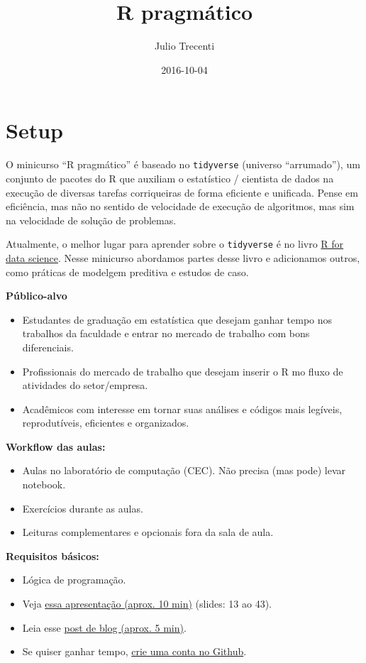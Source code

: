 \documentclass[]{book}
\title{R pragmático}
\author{Julio Trecenti}
\date{2016-10-04}
\providecommand{\tightlist}{%
  \setlength{\itemsep}{0pt}\setlength{\parskip}{0pt}}
\begin{document}
\maketitle

{
\setcounter{tocdepth}{1}
\tableofcontents
}
\chapter{Setup}\label{setup}

O minicurso ``R pragmático'' é baseado no \texttt{tidyverse} (universo
``arrumado''), um conjunto de pacotes do R que auxiliam o estatístico /
cientista de dados na execução de diversas tarefas corriqueiras de forma
eficiente e unificada. Pense em eficiência, mas não no sentido de
velocidade de execução de algoritmos, mas sim na velocidade de solução
de problemas.

Atualmente, o melhor lugar para aprender sobre o \texttt{tidyverse} é no
livro \href{http://r4ds.had.co.nz/}{R for data science}. Nesse minicurso
abordamos partes desse livro e adicionamos outros, como práticas de
modelgem preditiva e estudos de caso.

\textbf{Público-alvo}

\begin{itemize}
\tightlist
\item
  Estudantes de graduação em estatística que desejam ganhar tempo nos
  trabalhos da faculdade e entrar no mercado de trabalho com bons
  diferenciais.
\item
  Profissionais do mercado de trabalho que desejam inserir o R mo fluxo
  de atividades do setor/empresa.
\item
  Acadêmicos com interesse em tornar suas análises e códigos mais
  legíveis, reprodutíveis, eficientes e organizados.
\end{itemize}

\textbf{Workflow das aulas:}

\begin{itemize}
\tightlist
\item
  Aulas no laboratório de computação (CEC). Não precisa (mas pode) levar
  notebook.
\item
  Exercícios durante as aulas.
\item
  Leituras complementares e opcionais fora da sala de aula.
\end{itemize}

\textbf{Requisitos básicos:}

\begin{itemize}
\tightlist
\item
  Lógica de programação.
\item
  Veja
  \href{http://curso-r.github.io/slides/aula_00_01_apresentacao.html}{essa
  apresentação (aprox. 10 min)} (slides: 13 ao 43).
\item
  Leia esse
  \href{https://blog.rstudio.org/2016/09/15/tidyverse-1-0-0/}{post de
  blog (aprox. 5 min)}.
\item
  Se quiser ganhar tempo, \href{http://github.com}{crie uma conta no
  Github}.
\end{itemize}
\end{document}
